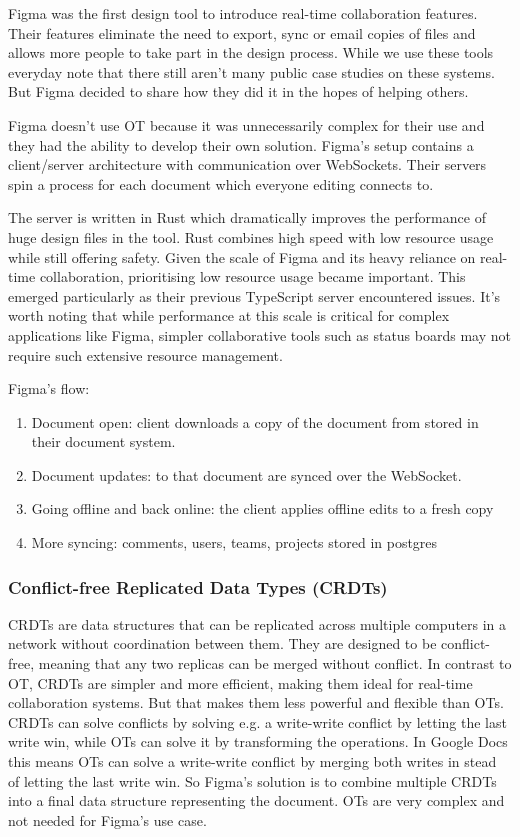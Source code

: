 Figma was the first design tool to introduce real-time collaboration features. Their features eliminate the need to export, sync or email copies of files and allows more people to take part in the design process. While we use these tools everyday note that there still aren't many public case studies on these systems. But Figma decided to share how they did it in the hopes of helping others.

Figma doesn't use OT because it was unnecessarily complex for their use and they had the ability to develop their own solution. Figma's setup contains a client/server architecture with communication over WebSockets. Their servers spin a process for each document which everyone editing connects to. \cite{figma-rtc}

The server is written in Rust which dramatically improves the performance of huge design files in the tool. Rust combines high speed with low resource usage while still offering safety. Given the scale of Figma and its heavy reliance on real-time collaboration, prioritising low resource usage became important. This emerged particularly as their previous TypeScript server encountered issues. It's worth noting that while performance at this scale is critical for complex applications like Figma, simpler collaborative tools such as status boards may not require such extensive resource management. \cite{figma-rust}

Figma's flow:

\begin{enumerate}
  \item Document open: client downloads a copy of the document from stored in their document system.
  \item Document updates: to that document are synced over the WebSocket.
  \item Going offline and back online: the client applies offline edits to a fresh copy
  \item More syncing: comments, users, teams, projects stored in postgres
\end{enumerate}

\subsubsection*{Conflict-free Replicated Data Types (CRDTs)}

CRDTs are data structures that can be replicated across multiple computers in a network without coordination between them. They are designed to be conflict-free, meaning that any two replicas can be merged without conflict. In contrast to OT, CRDTs are simpler and more efficient, making them ideal for real-time collaboration systems. But that makes them less powerful and flexible than OTs. CRDTs can solve conflicts by solving e.g. a write-write conflict by letting the last write win, while OTs can solve it by transforming the operations. In Google Docs this means OTs can solve a write-write conflict by merging both writes in stead of letting the last write win. So Figma's solution is to combine multiple CRDTs into a final data structure representing the document. OTs are very complex and not needed for Figma's use case.

